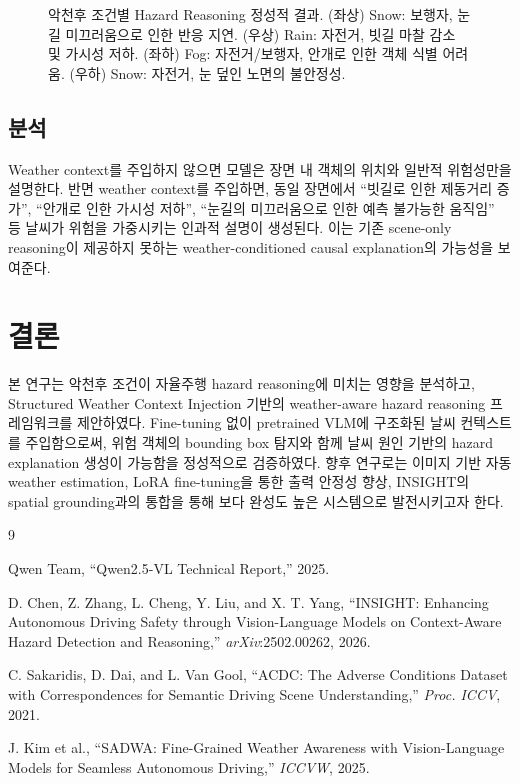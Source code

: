 \documentclass[a4paper,10pt]{article}
\begin{document}
\begin{figure}[h]
  \centering
  \fbox{\rule{0pt}{5.0cm}\rule{\columnwidth}{0pt}}
  \caption{악천후 조건별 Hazard Reasoning 정성적 결과. (좌상) Snow: 보행자, 눈길 미끄러움으로 인한 반응 지연. (우상) Rain: 자전거, 빗길 마찰 감소 및 가시성 저하. (좌하) Fog: 자전거/보행자, 안개로 인한 객체 식별 어려움. (우하) Snow: 자전거, 눈 덮인 노면의 불안정성.}
  \label{fig:qualitative}
\end{figure}

\subsection{분석}

Weather context를 주입하지 않으면 모델은 장면 내 객체의 위치와 일반적 위험성만을 설명한다. 반면 weather context를 주입하면, 동일 장면에서 ``빗길로 인한 제동거리 증가'', ``안개로 인한 가시성 저하'', ``눈길의 미끄러움으로 인한 예측 불가능한 움직임'' 등 날씨가 위험을 가중시키는 인과적 설명이 생성된다. 이는 기존 scene-only reasoning이 제공하지 못하는 weather-conditioned causal explanation의 가능성을 보여준다.

\section{결론}

본 연구는 악천후 조건이 자율주행 hazard reasoning에 미치는 영향을 분석하고, Structured Weather Context Injection 기반의 weather-aware hazard reasoning 프레임워크를 제안하였다. Fine-tuning 없이 pretrained VLM에 구조화된 날씨 컨텍스트를 주입함으로써, 위험 객체의 bounding box 탐지와 함께 날씨 원인 기반의 hazard explanation 생성이 가능함을 정성적으로 검증하였다. 향후 연구로는 이미지 기반 자동 weather estimation, LoRA fine-tuning을 통한 출력 안정성 향상, INSIGHT의 spatial grounding과의 통합을 통해 보다 완성도 높은 시스템으로 발전시키고자 한다.

\begin{thebibliography}{9}

Qwen Team, ``Qwen2.5-VL Technical Report,'' 2025.

D. Chen, Z. Zhang, L. Cheng, Y. Liu, and X. T. Yang,
``INSIGHT: Enhancing Autonomous Driving Safety through Vision-Language Models on Context-Aware Hazard Detection and Reasoning,''
\textit{arXiv}:2502.00262, 2026.

C. Sakaridis, D. Dai, and L. Van Gool,
``ACDC: The Adverse Conditions Dataset with Correspondences for Semantic Driving Scene Understanding,''
\textit{Proc. ICCV}, 2021.

J. Kim et al.,
``SADWA: Fine-Grained Weather Awareness with Vision-Language Models for Seamless Autonomous Driving,''
\textit{ICCVW}, 2025.

\end{thebibliography}
\end{document}
